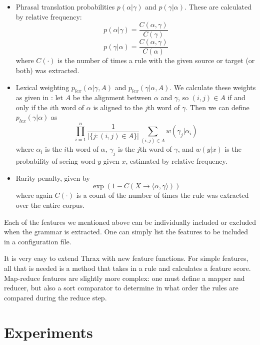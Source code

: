 \documentclass[11pt]{article}
\begin{document}
\begin{itemize}
\item Phrasal translation probabilities $p(\alpha|\gamma)$ and $p(\gamma|\alpha)$. These are calculated by relative frequency:
\begin{equation}
p(\alpha|\gamma) = \frac{C(\alpha,\gamma)}{C(\gamma)}
\end{equation}
\begin{equation}
p(\gamma|\alpha) = \frac{C(\alpha,\gamma)}{C(\alpha)}
\end{equation}
where $C(\cdot)$ is the number of times a rule with the given source or target (or both) was extracted.
\item Lexical weighting $p_{\textit{lex}}(\alpha|\gamma,A)$ and $p_{\textit{lex}}(\gamma|\alpha,A)$. We calculate these weights as given in \cite{koehn2003}: let $A$ be the alignment between $\alpha$ and $\gamma$, so $(i,j) \in A$ if and only if the $i$th word of $\alpha$ is aligned to the $j$th word of $\gamma$. Then we can define $p_{\textit{lex}}(\gamma|\alpha)$ as
\begin{equation}
\prod_{i=1}^n{\frac{1}{|\{j : (i,j) \in A\}|}\sum_{(i,j) \in A}{w(\gamma_j|\alpha_i)}}
\end{equation}
where $\alpha_i$ is the $i$th word of $\alpha$, $\gamma_j$ is the $j$th word of $\gamma$, and $w(y|x)$ is the probability of seeing word $y$ given $x$, estimated by relative frequency.
\item Rarity penalty, given by
\begin{equation}
\exp(1 - C(X \to \langle \alpha , \gamma \rangle))
\end{equation}
where again $C(\cdot)$ is a count of the number of times the rule was extracted over the entire corpus.
\end{itemize}

Each of the features we mentioned above can be individually included or excluded when the grammar is extracted. One can simply list the features to be included in a configuration file.

It is very easy to extend Thrax with new feature functions. For simple features, all that is needed is a method that takes in a rule and calculates a feature score. Map-reduce features are slightly more complex: one must define a mapper and reducer, but also a sort comparator to determine in what order the rules are compared during the reduce step.


\section{Experiments}
\label{section:results}
\end{document}
